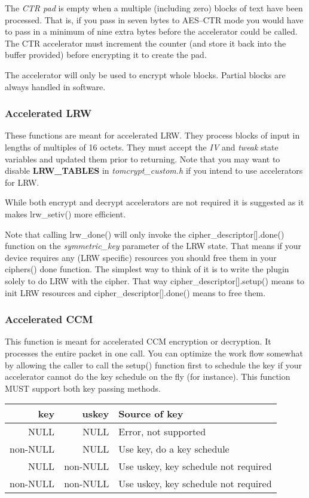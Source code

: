 \documentclass[synpaper]{book}
\begin{document}
The \textit{CTR pad} is empty when a multiple (including zero) blocks of text have been processed.  That is, if you pass in seven bytes to AES--CTR mode you would have to 
pass in a minimum of nine extra bytes before the accelerator could be called.  The CTR accelerator must increment the counter (and store it back into the 
buffer provided) before encrypting it to create the pad.  

The accelerator will only be used to encrypt whole blocks.  Partial blocks are always handled in software.

\subsubsection{Accelerated LRW}
These functions are meant for accelerated LRW.  They process blocks of input in lengths of multiples of 16 octets.  They must accept the \textit{IV} and \textit{tweak}
state variables and updated them prior to returning.  Note that you may want to disable \textbf{LRW\_TABLES} in \textit{tomcrypt\_custom.h} if you intend
to use accelerators for LRW.

While both encrypt and decrypt accelerators are not required it is suggested as it makes lrw\_setiv() more efficient.

Note that calling lrw\_done() will only invoke the cipher\_descriptor[].done() function on the \textit{symmetric\_key} parameter of the LRW state.  That means 
if your device requires any (LRW specific) resources you should free them in your ciphers() done function.  The simplest way to think of it is to write
the plugin solely to do LRW with the cipher.  That way cipher\_descriptor[].setup() means to init LRW resources and cipher\_descriptor[].done() means to
free them.

\subsubsection{Accelerated CCM}
This function is meant for accelerated CCM encryption or decryption.  It processes the entire packet in one call.  You can optimize the work flow somewhat
by allowing the caller to call the setup() function first to schedule the key if your accelerator cannot do the key schedule on the fly (for instance).  This 
function MUST support both key passing methods.

\begin{center}
\begin{small}
\begin{tabular}{|r|r|l|}
\hline \textbf{key} & \textbf{uskey} & \textbf{Source of key} \\
\hline NULL         & NULL           & Error, not supported \\
\hline non-NULL     & NULL           & Use key, do a key schedule \\
\hline NULL         & non-NULL       & Use uskey, key schedule not required \\
\hline non-NULL     & non-NULL       & Use uskey, key schedule not required \\
\hline
\end{tabular}
\end{small}
\end{center}
\end{document}
